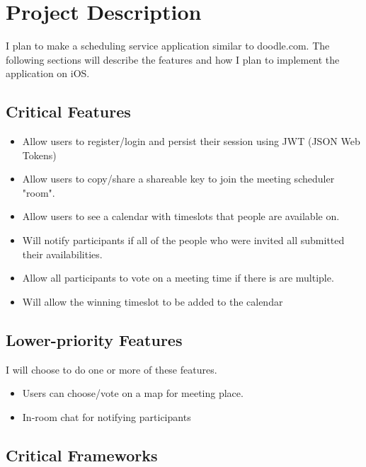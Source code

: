 \documentclass[11pt]{article}
\author{Andrew Chen}
\date{\today}
\title{}
\begin{document}
\tableofcontents

\section{Project Description}
\label{sec:org4e977e5}

I plan to make a scheduling service application similar to doodle.com. The following sections will
describe the features and how I plan to implement the application on iOS.

\subsection{Critical Features}
\label{sec:org4cf221f}

\begin{itemize}
\item Allow users to register/login and persist their session using JWT (JSON Web Tokens)
\item Allow users to copy/share a shareable key to join the meeting scheduler "room".
\item Allow users to see a calendar with timeslots that people are available on.
\item Will notify participants if all of the people who were invited all submitted their availabilities.
\item Allow all participants to vote on a meeting time if there is are multiple.
\item Will allow the winning timeslot to be added to the calendar
\end{itemize}

\subsection{Lower-priority Features}
\label{sec:org8cabcee}

I will choose to do one or more of these features.

\begin{itemize}
\item Users can choose/vote on a map for meeting place.
\item In-room chat for notifying participants
\end{itemize}

\subsection{Critical Frameworks}
\label{sec:orgb7011cd}
\end{document}
